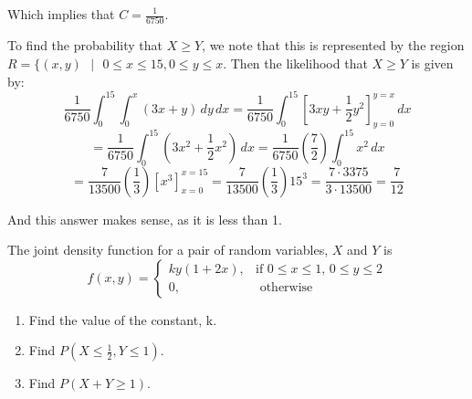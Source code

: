 Which implies that $C = \frac{1}{6750}$.

To find the probability that $X \geq Y$, we note that this is represented by 
the region $R = \{(x, y)\text{ }|\text{ }0 \leq x \leq 15, 0 \leq y \leq x$. 
Then the likelihood that $X \geq Y$ is given by:
$$\frac{1}{6750} \int_0^{15} \int_0^x \left( 3x + y \right) \,dy\,dx = \frac{
1}{6750} \int_0^{15} \left[ 3xy + \frac{1}{2}y^2 \right]_{y = 0}^{y = x}\,dx$$
$$= \frac{1}{6750} \int_0^{15} \left(3x^2 + \frac{1}{2}x^2 \right)\,dx = \frac{
1}{6750} \left( \frac{7}{2} \right) \int_0^{15} x^2\,dx$$
$$= \frac{7}{13500} \left( \frac{1}{3} \right) \left[x^3 \right]_{x = 0}^{x = 
15} = \frac{7}{13500} \left( \frac{1}{3} \right) 15^3 = \frac{7 \cdot 3375}{3 
\cdot 13500} = \frac{7}{12}$$

And this answer makes sense, as it is less than 1. 

\begin{Exercise}[title = {Joint Density Functions}, label = joint]
The joint density function for a pair of random variables, $X$ and $Y$ is
$$f(x, y) = 
\begin{cases}
	ky(1 + 2x),& \text{if } 0 \leq x \leq 1\text{, }0 \leq y \leq 2\\
	0,&\text{ otherwise}
\end{cases}$$
\begin{enumerate}
\item Find the value of the constant, k.
\item Find $P(X \leq \frac{1}{2}, Y \leq 1)$.
\item Find $P(X + Y \geq 1)$.
\end{enumerate}
\end{Exercise}

